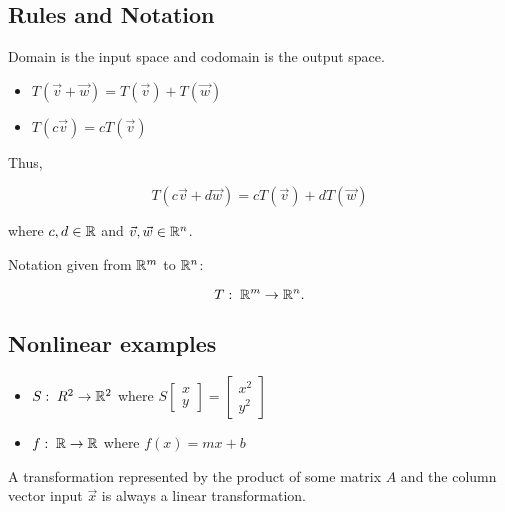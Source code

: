 \subsection{Rules and Notation}

Domain is the input space and codomain is the output space.

\begin{itemize}
    \item $T(\vec{v}+\vec{w})=T(\vec{v})+T(\vec{w})$
    \item $T(c\vec{v})=cT(\vec{v})$
\end{itemize}

Thus,

\[\boxed{T(c\vec{v}+d\vec{w})=cT(\vec{v})+dT(\vec{w})}\]

where $c,d\in \mathbb{R}$ and $\vec{v},\vec{w}\in \mathbb{R}^n$.\newline

Notation given from $\mathbb{R}^m$ to $\mathbb{R}^n$:

\[T:\; \mathbb{R}^m\rightarrow \mathbb{R}^n.\]

\subsection{Nonlinear examples}

\begin{itemize}
    \item $S:\;R^2\rightarrow\mathbb{R}^2$ where $S\begin{bmatrix}x\\y\end{bmatrix}=\begin{bmatrix}x^2\\y^2\end{bmatrix}$
    \item $f:\;\mathbb{R}\rightarrow\mathbb{R}$ where $f(x)=mx+b$
\end{itemize}

A transformation represented by the product of some matrix $A$ and the column vector input $\vec{x}$ is always a linear transformation.